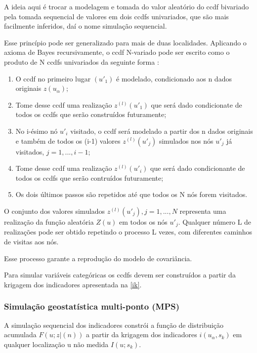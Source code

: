 A ideia aqui é trocar a modelagem e tomada do valor aleatório do ccdf bivariado pela tomada sequencial de valores em dois ccdfs univariados, que são mais facilmente inferidos, daí o nome simulação sequencial.

Esse princípio pode ser generalizado para mais de duas localidades. Aplicando o axioma de Bayes recursivamente, o ccdf N-variado pode ser escrito como o produto de N ccdfs univariados da seguinte forma \cite{goovaerts1997geostatistics}:

\begin{enumerate}
	\item O ccdf no primeiro lugar $(u'_{1})$ é modelado, condicionado aos n dados originais $z(u_{\alpha})$;
	\item Tome desse ccdf uma realização $z^{(l)}(u'_{1})$ que será dado condicionate de todos os ccdfs que serão construídos futuramente;
	\item No i-ésimo nó  $u'_{i}$ visitado, o ccdf será modelado a partir dos n dados originais e também de todos os (i-1) valores $z^{(l)}(u'_{j})$ simulados nos nós $u'_{j}$ já visitados, $j=1,...,i-1$;
	\item Tome desse ccdf uma realização $z^{(l)}(u'_{i})$ que será dado condicionante de todos os ccdfs que serão contruídos futuramente;
	\item Os dois últimos passos são repetidos até que todos os N nós forem visitados.
\end{enumerate}

O conjunto dos valores simulados $z^{(l)}(u'_{j}), j=1,...,N$ representa uma realização da função aleatória $Z(u)$ em todos os nós $u'_{j}$. Qualquer número L de realizações pode ser obtido repetindo o processo L vezes, com diferentes caminhos de visitas aos nós.

Esse processo garante a reprodução do modelo de covariância.

Para simular variáveis categóricas os ccdfs devem ser construídos a partir da krigagem dos indicadores apresentada na \autoref{ik}.

\subsubsection{Simulação geostatística multi-ponto (MPS)}

A simulação sequencial dos indicadores constrói a função de distribuição acumulada $F(u;z|(n))$ a partir da krigagem dos indicadores $i(u_{\alpha}, s_{k})$ em qualquer localização u não medida $I(u;s_{k})$.

